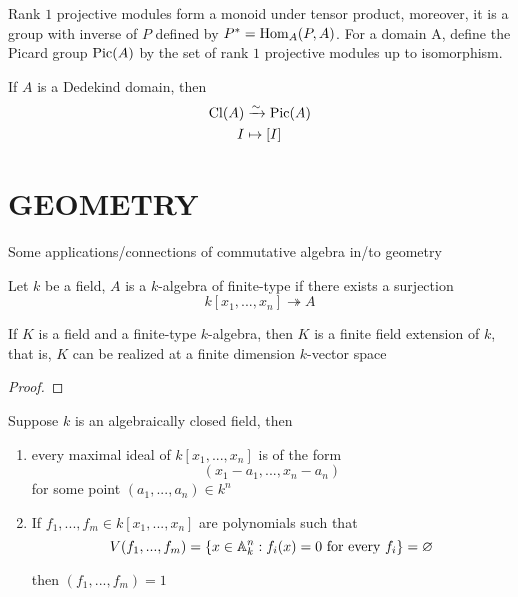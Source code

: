 \begin{remark}
	Rank $1$ projective modules form a monoid under tensor product, moreover, it is a group with inverse of $P$ defined by $P^* = \operatorname{Hom}_A(P, A)$. For a domain A, define the Picard group $\operatorname{Pic}(A)$ by the set of rank $1$ projective modules up to isomorphism.
\end{remark}

\begin{theorem}
	If $A$ is a Dedekind domain, then
	\begin{align*}
		\operatorname{Cl}(A) &\xrightarrow{\sim} \operatorname{Pic}(A) \\
		I &\mapsto [I]
	\end{align*}
\end{theorem}

\section{GEOMETRY}

Some applications/connections of commutative algebra in/to geometry

\begin{definition}
	Let $k$ be a field, $A$ is a $k$-algebra of finite-type if there exists a surjection
	$$
		k[x_1, ..., x_n] \twoheadrightarrow A
	$$
\end{definition}

\begin{proposition}
	If $K$ is a field and a finite-type $k$-algebra, then $K$ is a finite field extension of $k$, that is, $K$ can be realized at a finite dimension $k$-vector space 
\end{proposition}

\begin{proof}
\end{proof}

\begin{theorem}
	Suppose $k$ is an algebraically closed field, then
	\begin{enumerate}
		\item every maximal ideal of $k[x_1, ..., x_n]$ is of the form
		$$
			(x_1 - a_1, ..., x_n - a_n)
		$$
		for some point $(a_1, ..., a_n) \in k^n$
		
		\item If $f_1, ..., f_m \in k[x_1, ..., x_n]$ are polynomials such that
		$$
			V(f_1, ..., f_m) = \{x \in \mathbb{A}_k^n: f_i(x) = 0 \text{ for every } f_i\} = \varnothing
		$$
		
		then $(f_1, ..., f_m) = 1$
	\end{enumerate}
\end{theorem}

